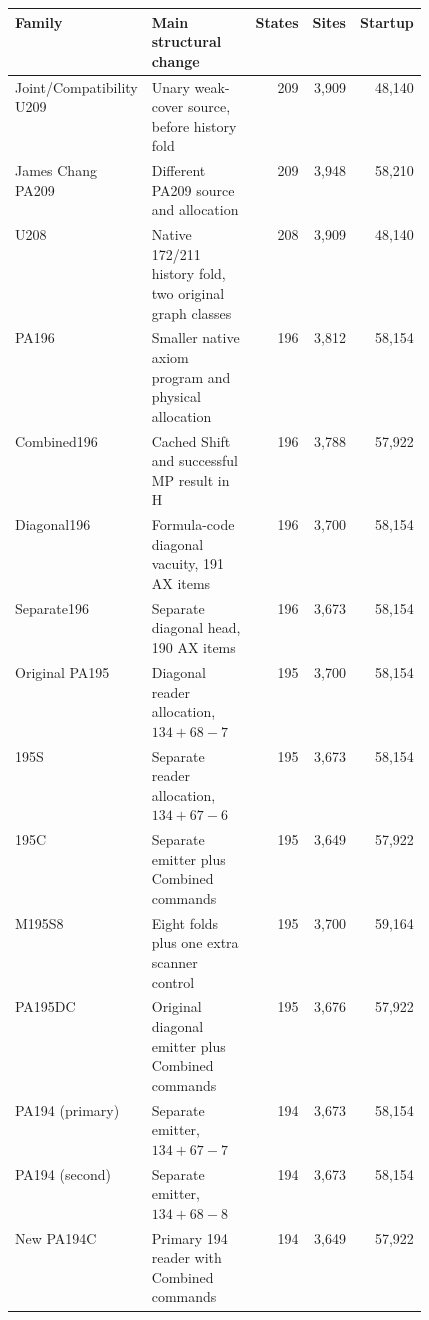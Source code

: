 \begin{center}\small
\begin{tabular}{@{}>{\raggedright\arraybackslash}p{0.18\linewidth}>{\raggedright\arraybackslash}p{0.30\linewidth}rrr@{}}
\toprule
Family & Main structural change & States & Sites & Startup\\
\midrule
Joint/Compatibility U209 & Unary weak-cover source, before history fold &209&3,909&48,140\\
James Chang PA209 & Different PA209 source and allocation &209&3,948&58,210\\
U208 & Native 172/211 history fold, two original graph classes &208&3,909&48,140\\
PA196 & Smaller native axiom program and physical allocation &196&3,812&58,154\\
Combined196 & Cached Shift and successful MP result in H &196&3,788&57,922\\
Diagonal196 & Formula-code diagonal vacuity, 191 AX items &196&3,700&58,154\\
Separate196 & Separate diagonal head, 190 AX items &196&3,673&58,154\\
Original PA195 & Diagonal reader allocation, $134+68-7$ &195&3,700&58,154\\
195S & Separate reader allocation, $134+67-6$ &195&3,673&58,154\\
195C & Separate emitter plus Combined commands &195&3,649&57,922\\
M195S8 & Eight folds plus one extra scanner control &195&3,700&59,164\\
PA195DC & Original diagonal emitter plus Combined commands &195&3,676&57,922\\
PA194 (primary) & Separate emitter, $134+67-7$ &194&3,673&58,154\\
PA194 (second) & Separate emitter, $134+68-8$ &194&3,673&58,154\\
New PA194C & Primary 194 reader with Combined commands &194&3,649&57,922\\
\bottomrule
\end{tabular}
\end{center}
